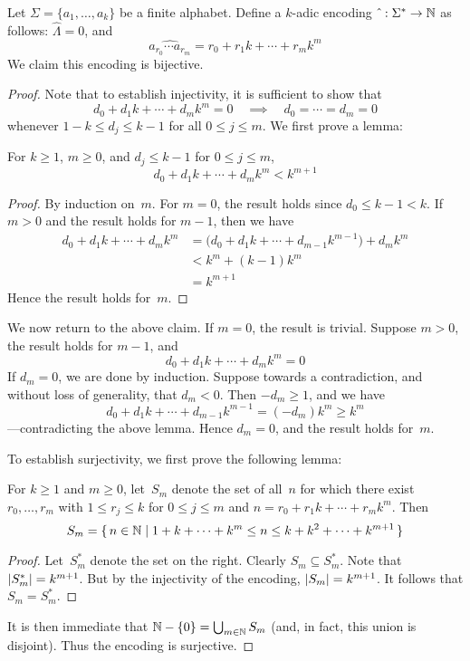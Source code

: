 \begin{rmk}
Let \(\Sigma=\{a_1,\ldots,a_k\}\) be a finite alphabet. Define a \(k\)-adic encoding \(\hat\ :\Sigma^*\to\mathbb{N}\) as follows: \(\hat{\Lambda}=0\), and
\[\widehat{a_{r_0}\cdots a_{r_m}}=r_0+r_1k+\cdots+r_mk^m\]
We claim this encoding is bijective.
\end{rmk}
\begin{proof}
Note that to establish injectivity, it is sufficient to show that
\[d_0+d_1k+\cdots+d_mk^m=0\quad\implies\quad d_0=\cdots=d_m=0\]
whenever \(1-k\le d_j\le k-1\) for all \(0\le j\le m\). We first prove a lemma:

\begin{lem}
For \(k\ge 1\), \(m\ge 0\), and \(d_j\le k-1\) for \(0\le j\le m\),
\[d_0+d_1k+\cdots+d_mk^m<k^{m+1}\]
\end{lem}
\begin{proof}
By induction on~\(m\). For \(m=0\), the result holds since \(d_0\le k-1<k\). If \(m>0\) and the result holds for \(m-1\), then we have
\begin{align*}
d_0+d_1k+\cdots+d_mk^m&=\bigl(d_0+d_1k+\cdots+d_{m-1}k^{m-1}\bigr)+d_mk^m\\
	&<k^m+(k-1)k^m\\
	&=k^{m+1}
\end{align*}
Hence the result holds for~\(m\).
\end{proof}
\noindent We now return to the above claim. If \(m=0\), the result is trivial. Suppose \(m>0\), the result holds for \(m-1\), and
\[d_0+d_1k+\cdots+d_mk^m=0\]
If \(d_m=0\), we are done by induction. Suppose towards a contradiction, and without loss of generality, that \(d_m<0\). Then \(-d_m\ge 1\), and we have
\[d_0+d_1k+\cdots+d_{m-1}k^{m-1}=(-d_m)k^m\ge k^m\]
---contradicting the above lemma. Hence \(d_m=0\), and the result holds for~\(m\).

To establish surjectivity, we first prove the following lemma:
\begin{lem}
For \(k\ge1\) and \(m\ge0\), let~\(S_m\) denote the set of all~\(n\) for which there exist \(r_0,\ldots,r_m\) with \(1\le r_j\le k\) for \(0\le j\le m\) and \(n=r_0+r_1k+\cdots+r_mk^m\). Then
\[S_m=\{\,n\in\mathbb{N}\mid 1+k+\cdots+k^m\le n\le k+k^2+\cdots+k^{m+1}\,\}\]
\end{lem}
\begin{proof}
Let~\(S_m^*\) denote the set on the right. Clearly \(S_m\subseteq S_m^*\). Note that \(|{S_m^*}|=k^{m+1}\). But by the injectivity of the encoding, \(|{S_m}|=k^{m+1}\). It follows that \(S_m=S_m^*\).
\end{proof}
\noindent It is then immediate that \(\mathbb{N}-\{0\}=\bigcup_{m\in\mathbb{N}}S_m\) (and, in fact, this union is disjoint). Thus the encoding is surjective.
\end{proof}

